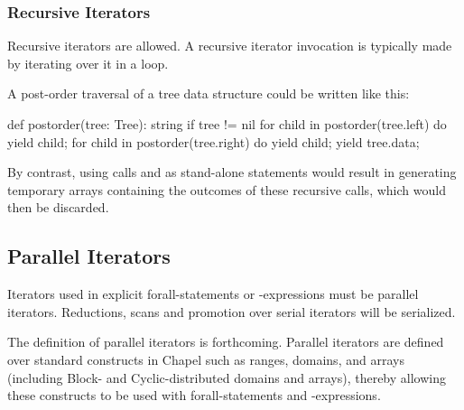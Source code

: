 \subsubsection{Recursive Iterators}
\label{Recursive_Iterators}

Recursive iterators are allowed. A recursive iterator invocation is
typically made by iterating over it in a loop.


\begin{example}
A post-order traversal of a tree data structure could be written like this:
\begin{chapel}
def postorder(tree: Tree): string {
  if tree != nil {
    for child in postorder(tree.left) do
      yield child;
    for child in postorder(tree.right) do
      yield child;
    yield tree.data;
  }
}
\end{chapel}
By contrast, using calls 
and  as stand-alone statements would
result in generating temporary arrays containing the outcomes of these
recursive calls, which would then be discarded.
\end{example}

\subsection{Parallel Iterators}
\label{Parallel_Iterators}

Iterators used in explicit forall-statements or -expressions must be
parallel iterators.  Reductions, scans and promotion over serial
iterators will be serialized.

The definition of parallel iterators is forthcoming.  Parallel
iterators are defined over standard constructs in Chapel such as
ranges, domains, and arrays (including Block- and Cyclic-distributed
domains and arrays), thereby allowing these constructs to be used with
forall-statements and -expressions.
